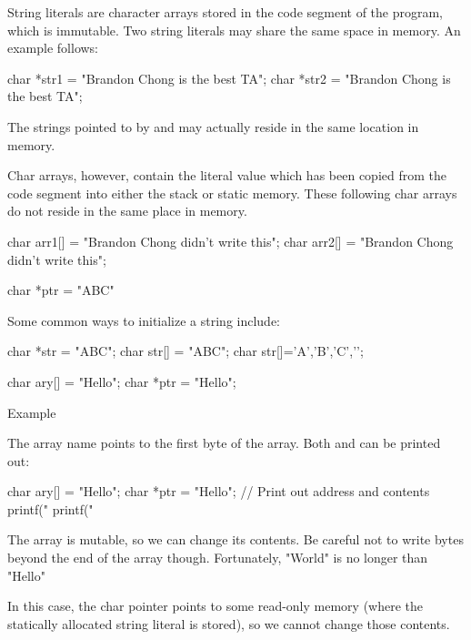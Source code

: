 String literals are character arrays stored in the code segment of the program, which is immutable. Two string literals may share the same space in memory. An example follows:

\begin{code}[language=C]
char *str1 = "Brandon Chong is the best TA";
char *str2 = "Brandon Chong is the best TA";
\end{code}

The strings pointed to by  and  may actually reside in the same location in memory.

Char arrays, however, contain the literal value which has been copied from the code segment into either the stack or static memory. These following char arrays do not reside in the same place in memory.

\begin{code}[language=C]
char arr1[] = "Brandon Chong didn't write this";
char arr2[] = "Brandon Chong didn't write this";
\end{code}

\begin{code}[language=C]
char *ptr = "ABC"
\end{code}

Some common ways to initialize a string include:

\begin{code}[language=C]
char *str = "ABC";
char str[] = "ABC";
char str[]={'A','B','C','\0'};
\end{code}

\begin{code}[language=C]
char ary[] = "Hello";
char *ptr = "Hello";
\end{code}

Example

The array name points to the first byte of the array. Both 
and  can be printed out:

\begin{code}[language=C]
char ary[] = "Hello";
char *ptr = "Hello";
// Print out address and contents
printf("%
printf("%
\end{code}

The array is mutable, so we can change its contents. Be careful not to write bytes beyond the end of the array though. Fortunately, "World" is no longer than "Hello"

In this case, the char pointer  points to some read-only memory (where the statically allocated string literal is stored), so we cannot change those contents.

